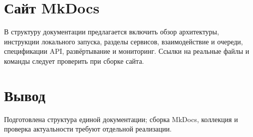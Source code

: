 \documentclass[14pt,a4paper]{extarticle}
\begin{document}
\section{Сайт MkDocs}
В структуру документации предлагается включить обзор архитектуры, инструкции локального запуска, разделы сервисов, взаимодействие и очереди, спецификации API, развёртывание и мониторинг. Ссылки на реальные файлы и команды следует проверить при сборке сайта.
\section{Вывод}
Подготовлена структура единой документации; сборка MkDocs, коллекция и проверка актуальности требуют отдельной реализации.
\end{document}
